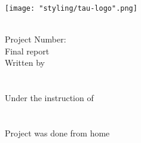 \centerline{\texttt{[image: "styling/tau-logo".png]}}
\vspace*{\fill}
\begin{center}
\doublespaced
{\Large\MakeUppercase{\projecttitle}}\\
\vspace{10pt}
{\large Project Number: \projectnum\\}
{\large Final report\\}
\vspace{10pt}
Written by\\
\projectauthorone\\
\projectauthortwo\\
\vspace{10pt}
Under the instruction of\\
\projectmentorone\\
\projectmentortwo\\
\vspace{20pt}
Project was done from home
\end{center}
\vspace*{\fill}
\clearpage